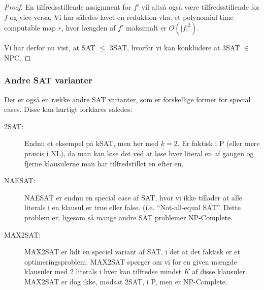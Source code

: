 \begin{proof}
En tilfredsstillende assignment for $f'$ vil altså også være tilfredsstillende for $f$ og vice-versa. Vi har således lavet en reduktion vha. et polynomial time computable map $r$, hvor længden af $f'$ maksimalt er $O(|f|^2)$.

Vi har derfor nu vist, at SAT $\leq$ 3SAT, hvorfor vi kan konkludere at 3SAT $\in$ NPC.
\end{proof}


\subsubsection{Andre SAT varianter}

Der er også en række andre SAT varianter, som er forskellige former for special cases. Disse kan hurtigt forklares således:
\begin{description}
 \item[2SAT:] Endnu et eksempel på kSAT, men her med $k=2$. Er faktisk i P (eller mere præcis i NL), da man kan løse det ved at løse hver literal en af gangen og fjerne klausulerne man har tilfredstillet en efter en.
 \item[NAESAT:] NAESAT er endnu en special case af SAT, hvor vi ikke tillader at alle literals i en klausul er true eller false. (i.e. ``Not-all-equal SAT''. Dette problem er, ligesom så mange andre SAT problemer NP-Complete.
 \item[MAX2SAT:] MAX2SAT er lidt en speciel variant af SAT, i det at det faktisk er et optimeringsproblem. MAX2SAT spørger om vi for en given mængde klausuler med 2 literals i hver kan tilfredse mindst $K$ af disse klausuler. MAX2SAT er dog ikke, modsat 2SAT, i P, men er NP-Complete.
\end{description}

